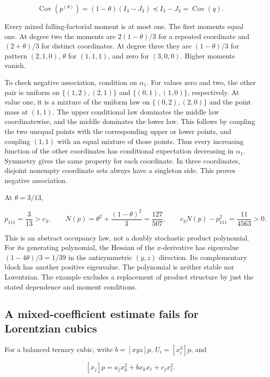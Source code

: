 \[
\operatorname{Cov}(p^{(\theta)})=(1-\theta)(I_3-J_3)
\preceq I_3-J_3=\operatorname{Cov}(q).
\]

Every mixed falling-factorial moment is at most one. The first moments equal one. At degree two the moments are \(2(1-\theta)/3\) for a repeated coordinate and \((2+\theta)/3\) for distinct coordinates. At degree three they are \((1-\theta)/3\) for pattern \((2,1,0)\), \(\theta\) for \((1,1,1)\), and zero for \((3,0,0)\). Higher moments vanish.

To check negative association, condition on \(\alpha_1\). For values zero and two, the other pair is uniform on \(\{(1,2),(2,1)\}\) and \(\{(0,1),(1,0)\}\), respectively. At value one, it is a mixture of the uniform law on \(\{(0,2),(2,0)\}\) and the point mass at \((1,1)\). The upper conditional law dominates the middle law coordinatewise, and the middle dominates the lower law. This follows by coupling the two unequal points with the corresponding upper or lower points, and coupling \((1,1)\) with an equal mixture of those points. Thus every increasing function of the other coordinates has conditional expectation decreasing in \(\alpha_1\). Symmetry gives the same property for each coordinate. In three coordinates, disjoint nonempty coordinate sets always have a singleton side. This proves negative association.

At \(\theta=3/13\),

\[
p_{111}=\frac3{13}>c_3,\qquad
N(p)=\theta^2+\frac{(1-\theta)^2}{3}=\frac{127}{507},
\qquad c_3N(p)-p_{111}^2=\frac{11}{4563}>0.
\]

This is an abstract occupancy law, not a doubly stochastic product polynomial. For its generating polynomial, the Hessian of the \(x\)-derivative has eigenvalue \((1-4\theta)/3=1/39\) in the antisymmetric \((y,z)\) direction. Its complementary block has another positive eigenvalue. The polynomial is neither stable nor Lorentzian. The example excludes a replacement of product structure by just the stated dependence and moment conditions.

\subsection{A mixed-coefficient estimate fails for Lorentzian cubics}\label{app:additional-15}

For a balanced ternary cubic, write \(b=[xyz]p\), \(U_i=[x_i^3]p\), and

\[
[x_j]p=a_jx_k^2+b x_kx_\ell+c_jx_\ell^2.
\]

